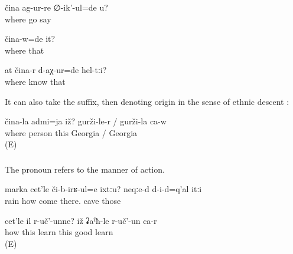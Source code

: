 \begin{exe}
	\ex	\label{ex:Are you (masc.) asking where he went}
	\gll	čina	ag-ur-re	∅-ik'-ul=de	u?\\
		where	go	say	\\
	\glt	{}

	\ex	\label{ex:Where was he}
	\gll	čina-w=de	it?\\
		where	that\\
	\glt	{}

	\ex	\label{ex:How did you get to know them (= the medical plants)}
	\gll	at	čina-r	d-aχ-ur=de	hel-tːi?\\
			where	know	that\\
	\glt	{}
\end{exe}

It can also take the  suffix, then denoting origin in the sense of ethnic descent :

\begin{exe}
	\ex	\label{ex:Where is this person from? (He) is from Georgia (i.e. he is Georgian)}
	\gll	čina-la	admi=ja	iž?	gurži-le-r	/	gurži-la	ca-w\\
		where	person	this	Georgia	/	Georgia	\\
	\glt	{} (E)
\end{exe}



\subsubsection{ }
\label{sssec:cetle how}

The pronoun  refers to the manner of action.

\begin{exe}
	\ex	\label{ex:How can rain fall there? They are inside a cave}
	\gll	marka	cet'le	či-b-irʁ-ul=e	ixtːu?	neqːe-d	d-i-d=q'al	itːi\\
		rain	how	come	there.	cave		those\\
	\glt	{}

	\ex	\label{ex:How is she studying? She is studying well}
	\gll	cet'le il	r-uč'-unne?	iž ʡaˁħ-le r-uč'-un ca-r\\
		how	this	learn	this	good	learn \\
	\glt	{} (E)
\end{exe}


